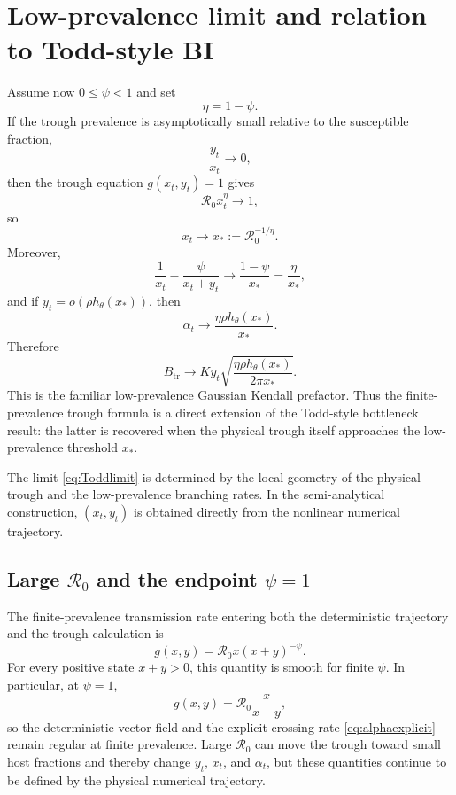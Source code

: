 \documentclass[11pt]{article}
\newcommand{\Rzero}{\mathcal R_0}
\newcommand{\hth}{h_\theta}
\begin{document}
\section{Low-prevalence limit and relation to Todd-style BI}

Assume now \(0\le\psi<1\) and set
\[
\eta=1-\psi.
\]
If the trough prevalence is asymptotically small relative to the susceptible fraction,
\[
\frac{y_t}{x_t}\to0,
\]
then the trough equation \(g(x_t,y_t)=1\) gives
\[
\Rzero x_t^{\eta}\to1,
\]
so
\begin{equation}
 x_t\to x_*:=\Rzero^{-1/\eta}.\label{eq:xstar}
\end{equation}
Moreover,
\[
\frac1{x_t}-\frac{\psi}{x_t+y_t}
\to
\frac{1-\psi}{x_*}
=\frac{\eta}{x_*},
\]
and if \(y_t=o(\rho\hth(x_*))\), then
\begin{equation}
\alpha_t
\to
\frac{\eta\rho\hth(x_*)}{x_*}.\label{eq:alphalow}
\end{equation}
Therefore
\begin{equation}
\boxed{
B_{\mathrm{tr}}
\to
K y_t
\sqrt{
\frac{\eta\rho\hth(x_*)}{2\pi x_*}
}.}
\label{eq:Toddlimit}
\end{equation}
This is the familiar low-prevalence Gaussian Kendall prefactor. Thus the finite-prevalence trough formula is a direct extension of the Todd-style bottleneck result: the latter is recovered when the physical trough itself approaches the low-prevalence threshold \(x_*\).

The limit \eqref{eq:Toddlimit} is determined by the local geometry of the physical trough and the low-prevalence branching rates. In the semi-analytical construction, \((x_t,y_t)\) is obtained directly from the nonlinear numerical trajectory.

\subsection{Large \(\Rzero\) and the endpoint \(\psi=1\)}

The finite-prevalence transmission rate entering both the deterministic trajectory and the trough calculation is
\[
 g(x,y)=\Rzero x(x+y)^{-\psi}.
\]
For every positive state \(x+y>0\), this quantity is smooth for finite \(\psi\). In particular, at \(\psi=1\),
\[
 g(x,y)=\Rzero\frac{x}{x+y},
\]
so the deterministic vector field and the explicit crossing rate \eqref{eq:alphaexplicit} remain regular at finite prevalence. Large \(\Rzero\) can move the trough toward small host fractions and thereby change \(y_t\), \(x_t\), and \(\alpha_t\), but these quantities continue to be defined by the physical numerical trajectory.
\end{document}
